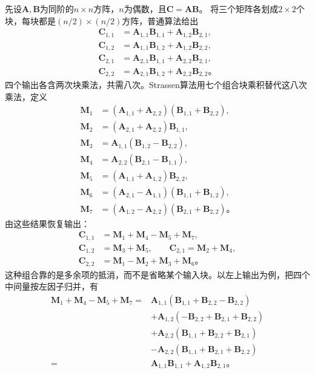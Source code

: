 先设$\bm A,\bm B$为同阶的$n\times n$方阵，$n$为偶数，且$\bm C=\bm A\bm B$。
将三个矩阵各划成$2\times2$个块，每块都是$(n/2)\times(n/2)$方阵，普通算法给出
\begin{equation}
  \begin{aligned}
    \bm C_{1,1}&=\bm A_{1,1}\bm B_{1,1}+\bm A_{1,2}\bm B_{2,1},\\
    \bm C_{1,2}&=\bm A_{1,1}\bm B_{1,2}+\bm A_{1,2}\bm B_{2,2},\\
    \bm C_{2,1}&=\bm A_{2,1}\bm B_{1,1}+\bm A_{2,2}\bm B_{2,1},\\
    \bm C_{2,2}&=\bm A_{2,1}\bm B_{1,2}+\bm A_{2,2}\bm B_{2,2}\text{。}
  \end{aligned}
  \label{eq:cnn-classical-block-product}
\end{equation}
四个输出各含两次块乘法，共需八次。Strassen算法用七个组合块乘积替代这八次乘法，定义
\begin{equation}
  \begin{aligned}
    \bm M_1&=(\bm A_{1,1}+\bm A_{2,2})(\bm B_{1,1}+\bm B_{2,2}),\\
    \bm M_2&=(\bm A_{2,1}+\bm A_{2,2})\bm B_{1,1},\\
    \bm M_3&=\bm A_{1,1}(\bm B_{1,2}-\bm B_{2,2}),\\
    \bm M_4&=\bm A_{2,2}(\bm B_{2,1}-\bm B_{1,1}),\\
    \bm M_5&=(\bm A_{1,1}+\bm A_{1,2})\bm B_{2,2},\\
    \bm M_6&=(\bm A_{2,1}-\bm A_{1,1})(\bm B_{1,1}+\bm B_{1,2}),\\
    \bm M_7&=(\bm A_{1,2}-\bm A_{2,2})(\bm B_{2,1}+\bm B_{2,2})\text{。}
  \end{aligned}
  \label{eq:cnn-strassen-products}
\end{equation}
由这些结果恢复输出：
\begin{equation}
  \begin{aligned}
    \bm C_{1,1}&=\bm M_1+\bm M_4-\bm M_5+\bm M_7,\\
    \bm C_{1,2}&=\bm M_3+\bm M_5,\qquad
    \bm C_{2,1}=\bm M_2+\bm M_4,\\
    \bm C_{2,2}&=\bm M_1-\bm M_2+\bm M_3+\bm M_6\text{。}
  \end{aligned}
  \label{eq:cnn-strassen-recovery}
\end{equation}
这种组合靠的是多余项的抵消，而不是省略某个输入块。以左上输出为例，把四个中间量按左因子归并，有
\begin{equation}
  \begin{aligned}
    \bm M_1+\bm M_4-\bm M_5+\bm M_7
    ={}&\bm A_{1,1}(\bm B_{1,1}+\bm B_{2,2}-\bm B_{2,2})\\
       &+\bm A_{1,2}(-\bm B_{2,2}+\bm B_{2,1}+\bm B_{2,2})\\
       &+\bm A_{2,2}(\bm B_{1,1}+\bm B_{2,2}+\bm B_{2,1})\\
       &-\bm A_{2,2}(\bm B_{1,1}+\bm B_{2,1}+\bm B_{2,2})\\
    ={}&\bm A_{1,1}\bm B_{1,1}+\bm A_{1,2}\bm B_{2,1}\text{。}
  \end{aligned}
  \label{eq:cnn-strassen-cancellation}
\end{equation}
